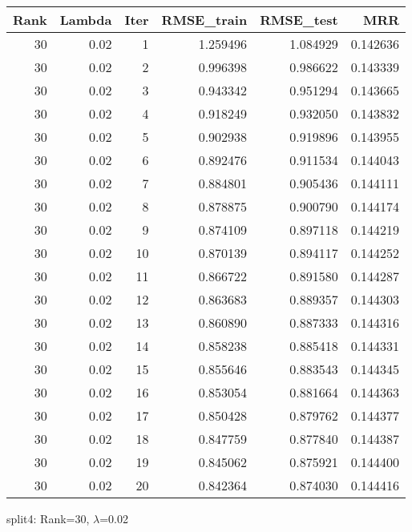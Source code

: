 \begin{tabular}{rrrrrr}
\toprule
 Rank &  Lambda &  Iter &  RMSE\_train &  RMSE\_test &       MRR \\
\midrule
   30 &    0.02 &     1 &    1.259496 &   1.084929 &  0.142636 \\
   30 &    0.02 &     2 &    0.996398 &   0.986622 &  0.143339 \\
   30 &    0.02 &     3 &    0.943342 &   0.951294 &  0.143665 \\
   30 &    0.02 &     4 &    0.918249 &   0.932050 &  0.143832 \\
   30 &    0.02 &     5 &    0.902938 &   0.919896 &  0.143955 \\
   30 &    0.02 &     6 &    0.892476 &   0.911534 &  0.144043 \\
   30 &    0.02 &     7 &    0.884801 &   0.905436 &  0.144111 \\
   30 &    0.02 &     8 &    0.878875 &   0.900790 &  0.144174 \\
   30 &    0.02 &     9 &    0.874109 &   0.897118 &  0.144219 \\
   30 &    0.02 &    10 &    0.870139 &   0.894117 &  0.144252 \\
   30 &    0.02 &    11 &    0.866722 &   0.891580 &  0.144287 \\
   30 &    0.02 &    12 &    0.863683 &   0.889357 &  0.144303 \\
   30 &    0.02 &    13 &    0.860890 &   0.887333 &  0.144316 \\
   30 &    0.02 &    14 &    0.858238 &   0.885418 &  0.144331 \\
   30 &    0.02 &    15 &    0.855646 &   0.883543 &  0.144345 \\
   30 &    0.02 &    16 &    0.853054 &   0.881664 &  0.144363 \\
   30 &    0.02 &    17 &    0.850428 &   0.879762 &  0.144377 \\
   30 &    0.02 &    18 &    0.847759 &   0.877840 &  0.144387 \\
   30 &    0.02 &    19 &    0.845062 &   0.875921 &  0.144400 \\
   30 &    0.02 &    20 &    0.842364 &   0.874030 &  0.144416 \\
\bottomrule
\end{tabular}

\caption{split4: Rank=30, $\lambda$=0.02}
